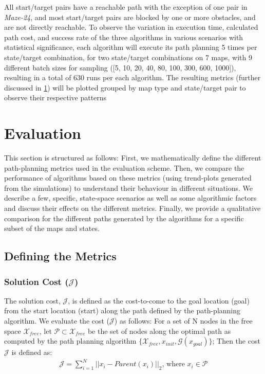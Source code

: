 \documentclass{article}
\newcommand*{\varfont}{\fontfamily{pcr}\selectfont}
\begin{document}
All start/target pairs have a reachable path with the exception of one pair in \emph{Maze-24}, and most start/target pairs are blocked by one or more obstacles, and are not directly reachable. To observe the variation in execution time, calculated path cost, and success rate of the three algorithms in various scenarios with statistical significance, each algorithm will execute its path planning 5 times per state/target combination, for two state/target combinations on 7 maps, with 9 different batch sizes for sampling ([5, 10, 20, 40, 80, 100, 300, 600, 1000]), resulting in a total of 630 runs per each algorithm. The resulting metrics (further discussed in \ref{sec:Evaluation}) will be plotted grouped by map type and state/target pair to observe their respective patterns


\section{Evaluation}
\label{sec:Evaluation}

This section is structured as follows: First, we mathematically define the different path-planning metrics used in the evaluation scheme. Then, we compare the performance of algorithms based on these metrics (using trend-plots generated from the simulations) to understand their behaviour in different situations. We describe a few, specific, state-space scenarios as well as some algorithmic factors and discuss their effects on the different metrics. Finally, we provide a qualitative comparison for the different paths generated by the algorithms for a specific subset of the maps and states.

\subsection{Defining the Metrics}

\subsubsection{Solution Cost ($\mathcal{J}$)}

The solution cost, $\mathcal{J}$, is defined as the cost-to-come to the goal location ({\varfont goal}) from the start location ({\varfont start}) along the path defined by the path-planning algorithm. We evaluate the cost ($\mathcal{J}$) as follows: For a set of N nodes in the free space $\mathcal{X}_{free}$, let $\mathcal{P} \subset \mathcal{X}_{free}$ be the set of nodes along the optimal path as computed by the path planning algorithm $\{ \mathcal{X}_{free}, x_{init}, \mathcal{G}(x_{goal})\}$; Then the cost $\mathcal{J}$ is defined as: 
\begin{align}
    \mathcal{J} = \sum_{i=1}^{N} ||x_i - Parent(x_i)||_2 \text{, where } x_i \in \mathcal{P}
\end{align}
\end{document}
